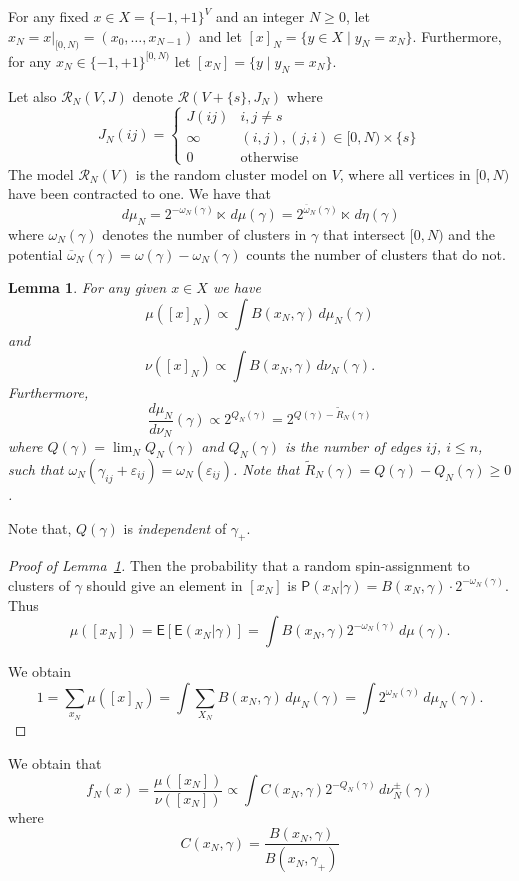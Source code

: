 \documentclass[11pt, a4paper, oneside]{article}
\newtheorem{lemma}[thm]{Lemma}
\theoremstyle{definition}
\theoremstyle{remark}
\renewcommand{\d}{\,d}
\providecommand{\dd}[2]{\dfrac{d#1}{d#2}}
\providecommand{\mscr}{\mathscr}
\providecommand{\ol}{\overline}
\providecommand{\E}{\mathsf{E}}
\renewcommand{\P}{\mathsf{P}}
\providecommand{\e}{\epsilon}
\providecommand{\tl}{\tilde}
\providecommand{\g}{\gamma}
\providecommand{\w}{\omega}
\def\e{\varepsilon}
\begin{document}
For any fixed $x\in X=\{-1,+1\}^V$ and an integer $N\ge 0$, let
$x_N=x\vert_{[0,N)} = (x_0,\dots, x_{N-1})$ and let
$[x]_N = \{y\in X\mid y_N = x_N\}$. Furthermore, for any
$x_N\in \{-1,+1\}^{[0,N)}$ let $[x_N]=\{y\mid y_N = x_N\}$.

Let also $\mscr R_N(V,J)$ denote $\mscr R(V+\{s\},J_N)$ where
$$
J_N(ij) =
\begin{cases} J(ij) & i,j\not= s \\
  \infty & (i,j),(j,i)\in [0,N)\times \{s\} \\
  0 & \text{otherwise}
\end{cases}
$$
The model $\mscr R_N(V)$ is the random cluster model on $V$, where all vertices
in $[0,N)$ have been contracted to one. We have that
$$
\d\mu_N = 2^{-\w_N(\g)} \ltimes \d\mu(\g) = 2^{\ol\w_N(\g)} \ltimes \d\eta(\g)
$$
where $\w_N(\g)$ denotes the number of clusters in $\g$ that intersect $[0,N)$
and the potential $\ol\w_N(\g) = \w(\g)-\w_N(\g)$ counts the number of clusters
that do not.
\begin{lemma}\label{lem:cyprob}
  For any given $x\in X$ we have
  $$ \mu([x]_N) \propto \int B(x_N,\gamma) \d\mu_N(\gamma) $$
  and
  $$ \nu([x]_N) \propto \int B(x_N,\gamma) \d\nu_N(\gamma). $$
  Furthermore,
  $$
  \dd{\mu_N}{\nu_N}(\g) \propto 2^{Q_N(\g)} = 2^{Q(\gamma)-\tl R_N(\gamma)}
  $$
  where $Q(\g)=\lim_N Q_N(\g)$ and $Q_N(\g)$ is the number of edges $ij$,
  $i\le n$, such that $\w_N(\g_{ij}+\e_{ij}) = \w_N(\e_{ij})$. Note that
  $\tl R_N(\g) = Q(\g) - Q_N(\g) \ge 0$.
\end{lemma}
Note that, $Q(\g)$ is \emph{independent} of $\g_+$.

\begin{proof}[Proof of Lemma~\ref{lem:cyprob}]
  Then the probability that a random spin-assignment to clusters of $\g$ should
  give an element in $[x_N]$ is $\P(x_N|\g) = B(x_N,\g)\cdot 2^{-\w_N(\g)}$.
  Thus
  $$
  \mu([x_N]) = \E\left[\E(x_N|\g)\right] = \int B(x_N,\g) 2^{-\w_N(\g)}\d\mu(\g).
  $$

  We obtain
  $$
  1 = \sum_{x_N}\mu([x]_N) = \int \sum_{X_N} B(x_N,\gamma) \d\mu_N(\gamma) = \int 2^{\w_N(\g)} \d\mu_N(\gamma).
  $$
\end{proof}

We obtain that
\[
  f_N(x) = \frac{\mu([x_N])}{\nu([x_N])} \propto \int C(x_N,\g) 2^{-Q_N(\g)}\d\nu_N^{\pm}(\g)
\]
where
\[
  C(x_N,\g) = \frac{B(x_N,\g)}{B(x_N,\g_+)}
\]
\end{document}
